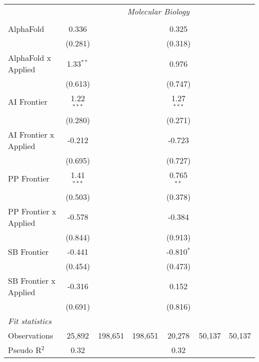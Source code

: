 \begin{tabular}{lcccccc}
 & \multicolumn{6}{c}{\textit{Molecular Biology}} \\ \\
   AlphaFold             & 0.336        &         &         & 0.325        &        &   \\   
                         & (0.281)      &         &         & (0.318)      &        &   \\   
   AlphaFold x Applied   & 1.33$^{**}$  &         &         & 0.976        &        &   \\   
                         & (0.613)      &         &         & (0.747)      &        &   \\   
   AI Frontier           & 1.22$^{***}$ &         &         & 1.27$^{***}$ &        &   \\   
                         & (0.280)      &         &         & (0.271)      &        &   \\   
   AI Frontier x Applied & -0.212       &         &         & -0.723       &        &   \\   
                         & (0.695)      &         &         & (0.727)      &        &   \\   
   PP Frontier           & 1.41$^{***}$ &         &         & 0.765$^{**}$ &        &   \\   
                         & (0.503)      &         &         & (0.378)      &        &   \\   
   PP Frontier x Applied & -0.578       &         &         & -0.384       &        &   \\   
                         & (0.844)      &         &         & (0.913)      &        &   \\   
   SB Frontier           & -0.441       &         &         & -0.810$^{*}$ &        &   \\   
                         & (0.454)      &         &         & (0.473)      &        &   \\   
   SB Frontier x Applied & -0.316       &         &         & 0.152        &        &   \\   
                         & (0.691)      &         &         & (0.816)      &        &   \\   
   \midrule
   \emph{Fit statistics}\\
   Observations          & 25,892       & 198,651 & 198,651 & 20,278       & 50,137 & 50,137\\  
   Pseudo R$^2$          & 0.32         &         &         & 0.32         &        & \\  
   

\end{tabular}
